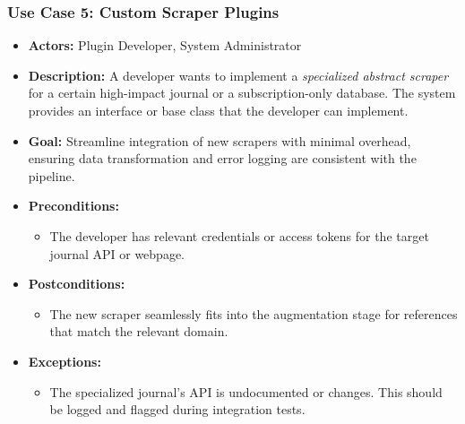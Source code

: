 \documentclass[12pt]{article}
\begin{document}
\subsubsection{Use Case 5: Custom Scraper Plugins}
\begin{itemize}
  \item \textbf{Actors:} Plugin Developer, System Administrator
  \item \textbf{Description:} A developer wants to implement a \emph{specialized abstract scraper} for a certain high-impact journal or a subscription-only database. The system provides an interface or base class that the developer can implement. 
  \item \textbf{Goal:} Streamline integration of new scrapers with minimal overhead, ensuring data transformation and error logging are consistent with the pipeline.
  \item \textbf{Preconditions:}
    \begin{itemize}
      \item The developer has relevant credentials or access tokens for the target journal API or webpage.
    \end{itemize}
  \item \textbf{Postconditions:}
    \begin{itemize}
      \item The new scraper seamlessly fits into the augmentation stage for references that match the relevant domain.
    \end{itemize}
  \item \textbf{Exceptions:}
    \begin{itemize}
      \item The specialized journal’s API is undocumented or changes. This should be logged and flagged during integration tests.
    \end{itemize}
\end{itemize}
\end{document}
